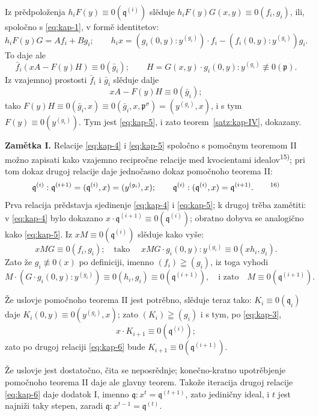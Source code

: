 \documentclass[11pt]{article}
\theoremstyle{plain}
\begin{document}
Iz prědpoloženja $h_{i}F(y) \equiv 0(\mathfrak{q}^{(i)})$
slěduje
$h_{i}F(y)G(x,y) \equiv 0(f_{i}, g_{i})$, ili, spoločno
s \eqref{eq:kap-1}, v formě identitetov:
\[
h_{i}F(y)G = Af_{i} + Bg_{i}; \qquad
h_{i}x = (g_{i}(0,y):y^{(g_{i})})\cdot f_{i}
- (f_{i}(0,y):y^{(g_{i})})g_{i}.
\]
To daje ale
\[
\bar{f}_{i}(xA - F(y)H) \equiv 0(\bar{g}_{i}); \qquad
H = G(x,y) \cdot g_{i}(0,y) : y^{(g_{i})} \not\equiv 0(\mathfrak{p}).
\]
Iz vzajemnoj prostosti $\bar{f}_{i}$ i $\bar{g}_{i}$ slěduje dalje
\[
xA - F(y)H \equiv 0(\bar{g}_{i});
\]
tako $F(y)H \equiv 0(\bar{g}_{i}, x)
\equiv 0(\bar{g}_{i}, x, \mathfrak{p}^{\sigma})
= (y^{(g_{i})}, x)$, i s tym $F(y) \equiv 0(y^{(g_{i})})$.
Tym jest \eqref{eq:kap-5}, i zato teorem~\ref{satz:kap-IV}, dokazany.

\smallskip
\textbf{Zamětka I.} Relacije \eqref{eq:kap-4} i \eqref{eq:kap-5}
spoločno s pomočnym teoremom II možno zapisati kako vzajemno
recipročne relacije med kvocientami idealov\textsuperscript{15)};
pri tom dokaz drugoj relacije daje jednočasno dokaz pomočnoho
teorema II:
\begin{equation}\label{eq:kap-6}
\mathfrak{q}^{(i)} : \mathfrak{q}^{(i+1)}
= (\mathfrak{q}^{(i)}, x) = (y^{(g_{i})}, x); \qquad
\mathfrak{q}^{(i)} : (\mathfrak{q}^{(i)}, x)
= \mathfrak{q}^{(i+1)}.\qquad\text{\textsuperscript{16)}}
\end{equation}
Prva relacija prědstavja sjedinenje \eqref{eq:kap-4} i
\eqref{eq:kap-5}; k drugoj trěba zamětiti: v \eqref{eq:kap-4}
bylo dokazano
$x \cdot \mathfrak{q}^{(i+1)} \equiv 0(\mathfrak{q}^{(i)})$;
obratno dobyva se analogično kako \eqref{eq:kap-5}. Iz
$xM \equiv 0(\mathfrak{q}^{(i)})$ slěduje kako vyše:
\[
xMG \equiv 0(f_{i}, g_{i}); \quad \text{tako }\quad
xMG \cdot g_{i}(0,y) : y^{(g_{i})}
\equiv 0(xh_{i}, g_{i}).
\]
Zato že $g_{i} \not\equiv 0(x)$ po definiciji, imenno
$(f_i)\geqq(g_i)$, iz toga vyhodi
\[
M \cdot (G \cdot g_{i}(0,y) : y^{(g_{i})})
\equiv 0(h_{i}, g_{i}) \equiv 0(\mathfrak{q}^{(i+1)}),
\quad\text{i zato}\quad M \equiv 0(\mathfrak{q}^{(i+1)}).
\]

Že uslovje pomočnoho teorema II jest potrěbno, slěduje teraz tako:
$K_i\equiv0(\mathfrak{q}_i)$ daje
$K_{i}(0,y) \equiv 0(y^{(g_{i})}, x)$; zato
$(K_i)\geqq(g_i)$ i s tym, po \eqref{eq:kap-3},
\[
x \cdot K_{i+1} \equiv 0(\mathfrak{q}^{(i)});
\]
zato po drugoj relaciji \eqref{eq:kap-6} bude
$K_{i+1} \equiv 0(\mathfrak{q}^{(i+1)})$.

Že uslovje jest dostatočno, čita se neposrědnje; konečno-kratno
upotrěbjenje pomočnoho teorema II daje ale glavny teorem. Takože
iteracija drugoj relacije \eqref{eq:kap-6} daje dodatok I, imenno
$\mathfrak{q} : x^{t} = \mathfrak{q}^{(t+1)}$, zato jediničny
ideal, i $t$ jest najniži taky stepen, zaradi
$\mathfrak{q} : x^{t-1} = \mathfrak{q}^{(t)}$.
\end{document}
